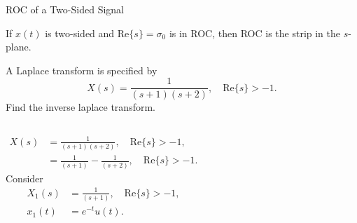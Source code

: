 \begin{frame}{ROC of a Two-Sided Signal}

    {
        If $x(t)$ is two-sided and $\mathrm{Re}\{s\} = \sigma_0$ is in ROC, then ROC is the strip in the $s$-plane.
    }
\end{frame}


\begin{frame}[t]{}
    \begin{example}
        A Laplace transform is specified by
        \begin{equation*}
            X(s) = \frac{1}{(s+1)(s+2)}, \quad \mathrm{Re}\{s\} > -1.
        \end{equation*}
        Find the inverse laplace transform.

        
    \end{example}
\end{frame}

\begin{frame}[t]{}
    {
        \begin{solution} \end{solution}
            \begin{columns}
                    
                    \begin{align*}
                        X(s) &= \frac{1}{(s+1)(s+2)}, \quad \mathrm{Re}\{s\} > -1,\\
                        &= \frac{1}{(s+1)} - \frac{1}{(s+2)}, \quad \mathrm{Re}\{s\} > -1.
                    \end{align*}
                    \pause
                    Consider
                    \begin{align*}
                        X_1(s) &= \frac{1}{(s+1)}, \quad \mathrm{Re}\{s\} > -1,\\
                        x_1(t) &= e^{-t}u(t).
                    \end{align*}
            \end{columns}

    }
\end{frame}


